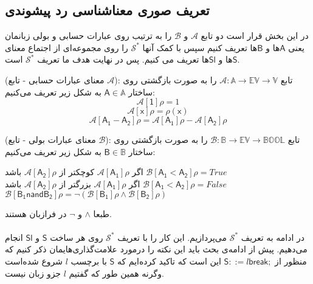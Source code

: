\subsection{تعریف صوری معناشناسی رد پیشوندی}
در این بخش قرار است دو تابع $\mathcal{A}$ و $\mathcal{B}$ را به ترتیب روی عبارات حسابی و بولی زبانمان یعنی $\mathsf{A}$ها و $\mathsf{B}$ها تعریف کنیم سپس با کمک آنها $\mathcal{S^*}$ را روی  مجموعه‌ای از اجتماع معنای $\mathsf{S}$ها و $\mathsf{Sl}$ها تعریف می کنیم. پس در نهایت هدف ما تعریف  $\mathcal{S^*}$ است.


\begin{defn}
(معنای عبارات حسابی - تابع $\mathcal{A}$): تابع 
$\mathcal{A}:\mathbb{A}\rightarrow \mathbb{EV} \rightarrow \mathbb{V}$
را به صورت بازگشتی روی ساختار 
$\mathsf{A} \in \mathbb{A}$
به شکل زیر تعریف می‌کنیم:
$$\mathcal{A[\mathsf{1}]\rho = }1     $$
$$\mathcal{A[\mathsf{x}]\rho = } \rho(\mathsf{x})          $$
$$\mathcal{A[\mathsf{A_1-A_2}]\rho = }\mathcal{A[\mathsf{A_1}]\rho }- \mathcal{A[\mathsf{A_2}]\rho }       $$

\end{defn}

\begin{defn}
	(معنای عبارات بولی - تابع $\mathcal{B}$): تابع 
	$\mathcal{B}: \mathbb{B} \rightarrow \mathbb{EV} \rightarrow \mathbb{BOOL}$
	را به صورت بازگشتی روی ساختار 
	$\mathsf{B} \in \mathbb{B}$
	به شکل زیر تعریف می‌کنیم:

\begin{center}
	اگر $\mathcal{A[\mathsf{A_1}]\rho }$ کوچکتر از $\mathcal{A[\mathsf{A_2}]\rho }$ باشد
	$\mathcal{B[\mathsf{A_1<A_2}]\rho = } True   \hspace{2cm}  $\\
	اگر $\mathcal{A[\mathsf{A_1}]\rho }$ بزرگتر از $\mathcal{A[\mathsf{A_2}]\rho }$ باشد
	$\mathcal{B[\mathsf{A_1<A_2}]\rho = } False   \hspace{2cm}  $\\
	$ \mathcal{B[\mathsf{B_1 nand B_2}]\rho = } \neg(\mathcal{B[\mathsf{B_1}]\rho}   \wedge \mathcal{B[\mathsf{B_2}]\rho}) $
\end{center}
\end{defn}

طبعا $\wedge$ و $\neg$ در فرازبان هستند.\\\\
در ادامه به تعریف $\mathcal{S^*}$ می‌پردازیم. این کار را با تعریف $\mathcal{S^*}$ روی هر ساخت $\mathsf{S}$ و $\mathsf{Sl}$ انجام می‌دهیم.
پیش از ادامه‌ی بحث باید این نکته را در‌مورد علامت‌گذاری‌هایمان ذکر کنیم که منظور از $        \mathsf{S} ::= l \mathsf{break;}  $ این است که تاکید کرده‌ایم که $\mathsf{S}$ با برچسب $l$ شروع شده‌است وگرنه همین طور که گفتیم   $l$ جزو زبان نیست.\\\\

